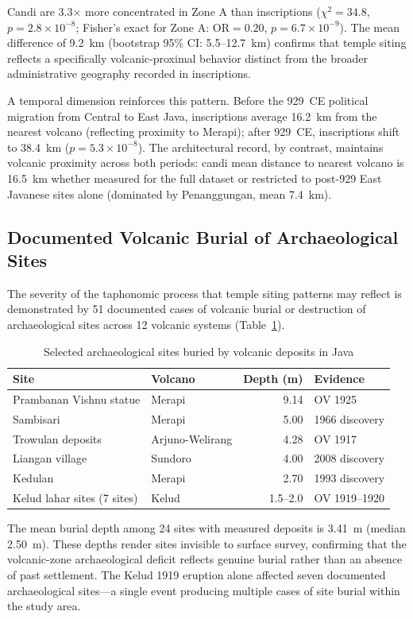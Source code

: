 \documentclass[12pt,a4paper]{article}
\begin{document}
Candi are 3.3$\times$ more concentrated in Zone A than inscriptions ($\chi^2=34.8$, $p=2.8\times10^{-8}$; Fisher's exact for Zone A: OR$=0.20$, $p=6.7\times10^{-9}$). The mean difference of 9.2~km (bootstrap 95\% CI: 5.5--12.7~km) confirms that temple siting reflects a specifically volcanic-proximal behavior distinct from the broader administrative geography recorded in inscriptions.

A temporal dimension reinforces this pattern. Before the 929~CE political migration from Central to East Java, inscriptions average 16.2~km from the nearest volcano (reflecting proximity to Merapi); after 929~CE, inscriptions shift to 38.4~km ($p=5.3\times10^{-8}$). The architectural record, by contrast, maintains volcanic proximity across both periods: candi mean distance to nearest volcano is 16.5~km whether measured for the full dataset or restricted to post-929 East Javanese sites alone (dominated by Penanggungan, mean 7.4~km).

\subsection{Documented Volcanic Burial of Archaeological Sites}

The severity of the taphonomic process that temple siting patterns may reflect is demonstrated by 51 documented cases of volcanic burial or destruction of archaeological sites across 12 volcanic systems (Table~\ref{tab:burial}).

\begin{table}[h]
\centering
\caption{Selected archaeological sites buried by volcanic deposits in Java}
\begin{tabular}{llrl}
\toprule
Site & Volcano & Depth (m) & Evidence \\
\midrule
Prambanan Vishnu statue & Merapi & 9.14 & OV 1925 \\
Sambisari & Merapi & 5.00 & 1966 discovery \\
Trowulan deposits & Arjuno-Welirang & 4.28 & OV 1917 \\
Liangan village & Sundoro & 4.00 & 2008 discovery \\
Kedulan & Merapi & 2.70 & 1993 discovery \\
Kelud lahar sites (7 sites) & Kelud & 1.5--2.0 & OV 1919--1920 \\
\bottomrule
\end{tabular}
\label{tab:burial}
\end{table}

The mean burial depth among 24 sites with measured deposits is 3.41~m (median 2.50~m). These depths render sites invisible to surface survey, confirming that the volcanic-zone archaeological deficit reflects genuine burial rather than an absence of past settlement. The Kelud 1919 eruption alone affected seven documented archaeological sites---a single event producing multiple cases of site burial within the study area.
\end{document}
